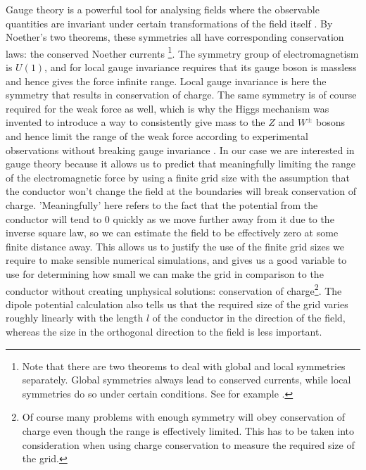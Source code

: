 \documentclass[aps,twocolumn,pre,nofootinbib,10pt]{revtex4-1}
\begin{document}
Gauge theory is a powerful tool for analysing fields where the observable quantities are invariant under certain transformations of the field itself \cite{gaugetheory1}. By Noether's two theorems, these symmetries all have corresponding conservation laws: the conserved Noether currents \footnote{Note that there are two theorems to deal with global and local symmetries separately. Global symmetries always lead to conserved currents, while local symmetries do so under certain conditions. See for example \cite{gaugetheory2}.}. The symmetry group of electromagnetism is $U(1)$, and for local gauge invariance requires that its gauge boson is massless and hence gives the force infinite range. Local gauge invariance is here the symmetry that results in conservation of charge. The same symmetry is of course required for the weak force as well, which is why the Higgs mechanism was invented to introduce a way to consistently give mass to the 
$Z$ and $W^{\pm}$ bosons and hence limit the range of the weak force according to experimental observations without breaking gauge invariance \cite{gaugetheory3}. In our case we are interested in gauge theory because it allows us to predict that meaningfully limiting the range of the electromagnetic force by using a finite grid size with the assumption that the conductor won't change the field at the 
boundaries will break conservation of charge. 'Meaningfully' here refers to the fact that the potential from the conductor will tend to 0 quickly as we move further away from it due to the inverse square law, so we can estimate the field to be effectively zero at some finite distance away. This allows us to justify the use of the finite grid sizes we require to make sensible numerical simulations, and gives us a good variable to use for determining how small we can make the grid in comparison to the conductor without creating unphysical solutions: conservation of charge\footnote{Of course many problems with enough symmetry will obey conservation of charge even though the range is effectively limited. This has to be taken into consideration when using charge conservation to measure the required size of the grid.}. The dipole potential calculation also tells us that the required size of the grid varies roughly linearly with the length $l$ of the conductor in the direction of the field, whereas the size in the orthogonal direction to the field is less important.
\end{document}
